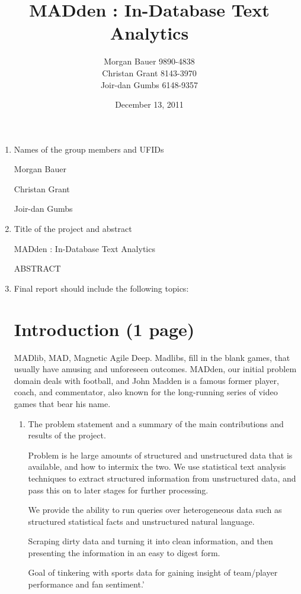 \documentclass{article}
\title{MADden : In-Database Text Analytics}
\author{Morgan Bauer 9890-4838 \\
  Christan Grant 8143-3970 \\
  Joir-dan Gumbs 6148-9357}
\date{December 13, 2011}
\begin{document}
\maketitle
\begin{enumerate}
\item Names of the group members and UFIDs


  Morgan Bauer

  Christan Grant

  Joir-dan Gumbs

\item Title of the project and abstract

  MADden : In-Database Text Analytics

  ABSTRACT



\item Final report should include the following topics:

  \section{Introduction (1 page)}

  MADlib, MAD, Magnetic Agile Deep.
  Madlibs, fill in the blank games, that usually have amusing and unforeseen outcomes.
  MADden, our initial problem domain deals with football,
  and John Madden is a famous former player, coach, and commentator,
  also known for the long-running series of video games that bear his name.

  \begin{enumerate}
  \item The problem statement and a summary of the main contributions and results of the project.

    Problem is he large amounts of structured and unstructured data that is available, and how to intermix the two.
    We use statistical text analysis techniques to extract structured information from unstructured data,
    and pass this on to later stages for further processing.

    We provide the ability to run queries over heterogeneous data such as structured statistical facts and unstructured natural language.

    Scraping dirty data and turning it into clean information, and then presenting the information in an easy to digest form.


    Goal of tinkering with sports data for gaining insight of team/player performance and fan sentiment.'


\end{enumerate}
\end{enumerate}
\end{document}
